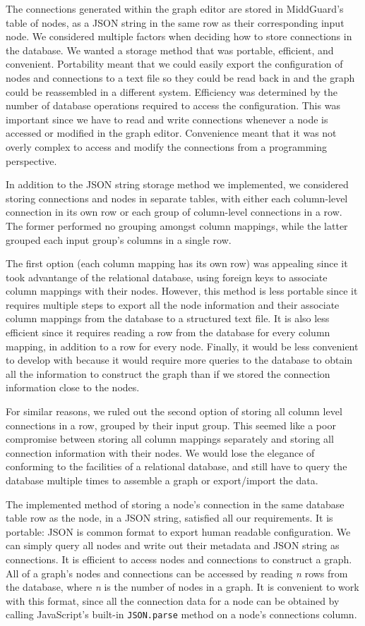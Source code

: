 \documentclass[midd]{thesis}
\begin{document}
The connections generated within the graph editor are stored in MiddGuard's
table of nodes, as a JSON string in the same row as their corresponding input
node. We considered multiple factors when deciding how to store connections in
the database. We wanted a storage method that was portable, efficient, and
convenient. Portability meant that we could easily export the configuration of
nodes and connections to a text file so they could be read back in and the graph
could be reassembled in a different system. Efficiency was determined by the
number of database operations required to access the configuration. This was
important since we have to read and write connections whenever a node is
accessed or modified in the graph editor. Convenience meant that it was not
overly complex to access and modify the connections from a programming
perspective.

In addition to the JSON string storage method we implemented, we considered
storing connections and nodes in separate tables, with either each column-level
connection in its own row or each group of column-level connections in a row.
The former performed no grouping amongst column mappings, while the latter
grouped each input group's columns in a single row.

The first option (each column mapping has its own row) was appealing since it
took advantange of the relational database, using foreign keys to associate
column mappings with their nodes. However, this method is less portable since it
requires multiple steps to export all the node information and their associate
column mappings from the database to a structured text file. It is also less
efficient since it requires reading a row from the database for every column
mapping, in addition to a row for every node. Finally, it would be less
convenient to develop with because it would require more queries to the database
to obtain all the information to construct the graph than if we stored the
connection information close to the nodes.

For similar reasons, we ruled out the second option of storing all column level
connections in a row, grouped by their input group. This seemed like a poor
compromise between storing all column mappings separately and storing all
connection information with their nodes. We would lose the elegance of
conforming to the facilities of a relational database, and still have to query
the database multiple times to assemble a graph or export/import the data.

The implemented method of storing a node's connection in the same database table
row as the node, in a JSON string, satisfied all our requirements. It is
portable: JSON is common format to export human readable configuration. We can
simply query all nodes and write out their metadata and JSON string as
connections. It is efficient to access nodes and connections to construct a
graph. All of a graph's nodes and connections can be accessed by reading
\textit{n} rows from the database, where \textit{n} is the number of nodes in a
graph. It is convenient to work with this format, since all the connection data
for a node can be obtained by calling JavaScript's built-in \texttt{JSON.parse}
method on a node's connections column.
\end{document}
